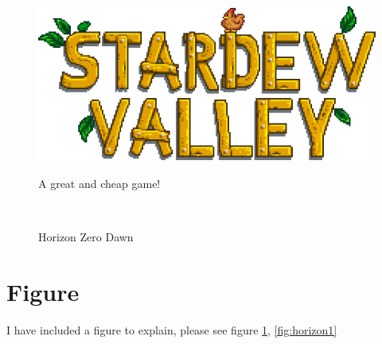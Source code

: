 \documentclass{article}
\begin{document}


\begin{figure}[!h]
\begin{center}    %
\includegraphics[angle=45,width=.8\textwidth]{Stardew_Main_Logo}
\caption{A great and cheap game!}
\label{fig:logo}


\\
\caption{Horizon Zero Dawn}
\end{center}
\end{figure}

\section{Figure}
I have included a figure to explain, please see figure \ref{fig:logo}, \ref{fig:horizon1}
\end{document}
